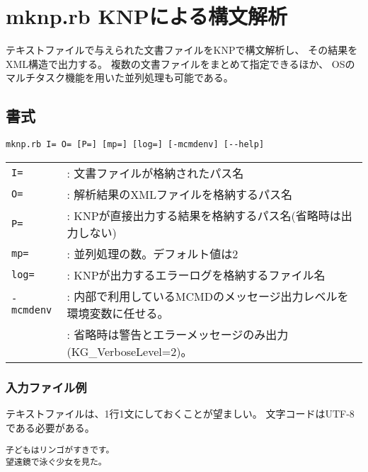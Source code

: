 



\section{mknp.rb KNPによる構文解析\label{sect:mknp}}

テキストファイルで与えられた文書ファイルをKNPで構文解析し、
その結果をXML構造で出力する。
複数の文書ファイルをまとめて指定できるほか、
OSのマルチタスク機能を用いた並列処理も可能である。

\subsection{書式}
\begin{verbatim}
mknp.rb I= O= [P=] [mp=] [log=] [-mcmdenv] [--help]
\end{verbatim}

\begin{table}[htbp]
{\small
\begin{tabular}{ll}
\verb|I=|       & : 文書ファイルが格納されたパス名 \\
\verb|O=|       & : 解析結果のXMLファイルを格納するパス名 \\
\verb|P=|       & : KNPが直接出力する結果を格納するパス名(省略時は出力しない) \\
\verb|mp=|      & : 並列処理の数。デフォルト値は2 \\
\verb|log=|     & : KNPが出力するエラーログを格納するファイル名 \\
\verb|-mcmdenv| & : 内部で利用しているMCMDのメッセージ出力レベルを環境変数に任せる。 \\
                & : 省略時は警告とエラーメッセージのみ出力(KG\_VerboseLevel=2)。 \\
\end{tabular} 
}
\end{table} 


\subsubsection*{入力ファイル例} 

テキストファイルは、1行1文にしておくことが望ましい。
文字コードはUTF-8である必要がある。

\begin{Verbatim}[baselinestretch=0.7,frame=single]
子どもはリンゴがすきです。
望遠鏡で泳ぐ少女を見た。
\end{Verbatim}


